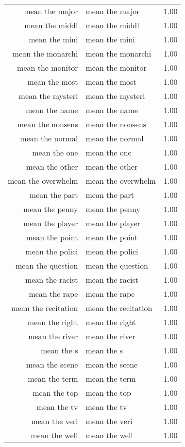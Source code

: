 \begin{table}[ht]
\begin{tabular}{rlr}
  mean the major & mean the major & 1.00 \\ 
  mean the middl & mean the middl & 1.00 \\ 
  mean the mini & mean the mini & 1.00 \\ 
  mean the monarchi & mean the monarchi & 1.00 \\ 
  mean the monitor & mean the monitor & 1.00 \\ 
  mean the most & mean the most & 1.00 \\ 
  mean the mysteri & mean the mysteri & 1.00 \\ 
  mean the name & mean the name & 1.00 \\ 
  mean the nonsens & mean the nonsens & 1.00 \\ 
  mean the normal & mean the normal & 1.00 \\ 
  mean the one & mean the one & 1.00 \\ 
  mean the other & mean the other & 1.00 \\ 
  mean the overwhelm & mean the overwhelm & 1.00 \\ 
  mean the part & mean the part & 1.00 \\ 
  mean the penny & mean the penny & 1.00 \\ 
  mean the player & mean the player & 1.00 \\ 
  mean the point & mean the point & 1.00 \\ 
  mean the polici & mean the polici & 1.00 \\ 
  mean the question & mean the question & 1.00 \\ 
  mean the racist & mean the racist & 1.00 \\ 
  mean the rape & mean the rape & 1.00 \\ 
  mean the recitation & mean the recitation & 1.00 \\ 
  mean the right & mean the right & 1.00 \\ 
  mean the river & mean the river & 1.00 \\ 
  mean the s & mean the s & 1.00 \\ 
  mean the scene & mean the scene & 1.00 \\ 
  mean the term & mean the term & 1.00 \\ 
  mean the top & mean the top & 1.00 \\ 
  mean the tv & mean the tv & 1.00 \\ 
  mean the veri & mean the veri & 1.00 \\ 
  mean the well & mean the well & 1.00 \\ 

\end{tabular}
\end{table}
